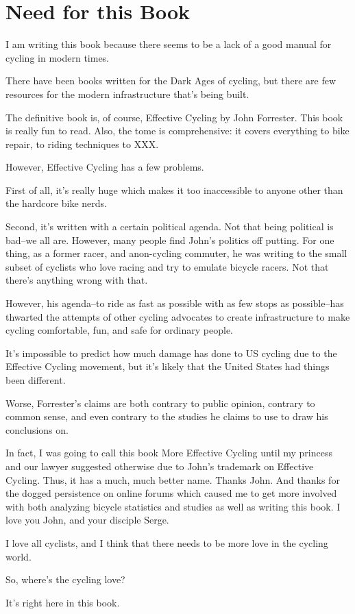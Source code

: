 \chapter{Need for this Book}

I am writing this book because there seems to be a lack of a
good manual for cycling in modern times.

There have been books written for the Dark Ages of cycling, but there are few
resources for the modern infrastructure that's being built. 

The definitive book is, of course, Effective Cycling by John Forrester. This
book is really fun to read. Also, the tome is comprehensive: it covers everything to bike repair, to riding techniques to XXX.

However, Effective Cycling has a few problems.

First of all, it's really huge which makes it too inaccessible to anyone other than the hardcore bike nerds.

Second, it's  written with a certain political agenda. Not that being political is bad--we all are. However, many people find John's politics off putting. For one thing, as a former racer, and anon-cycling commuter, he was writing to the small subset of cyclists who love racing and try to emulate bicycle racers. Not that there's anything wrong with that.

However, his agenda--to ride as fast as possible with as few stops as possible--has thwarted the attempts of other cycling advocates to create infrastructure to make cycling comfortable, fun, and safe for ordinary people.

It's impossible to predict how much damage has done to US cycling due to the Effective Cycling movement, but it's likely that the United States had things been different.

Worse, Forrester's claims are both contrary to public opinion, contrary to common sense, and even contrary to the studies he claims to use to draw his conclusions on.

In fact, I was going to call this book More Effective Cycling until my princess and our lawyer suggested otherwise due to John's trademark on Effective Cycling. Thus, it has a much, much better name. Thanks John. And thanks for the dogged persistence on online forums which caused me to get more involved with both analyzing bicycle statistics and studies as well as writing this book. I love you John, and your disciple Serge.

I love all cyclists, and I think that there needs to be more love in the cycling world.

So, where's the cycling love?

It's right here in this book. 

